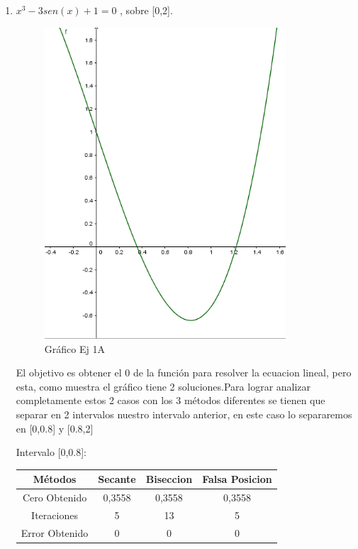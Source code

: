 \documentclass{udpreport}
\begin{document}
\begin{enumerate}
\begin{enumerate}
    \item  \(x^3 - 3sen(x) +1 = 0\) , sobre [0,2].
        \begin{figure}[H]
            \centering
            \includegraphics[width=9cm]{GraficoEj1a}
             \caption{Gráfico Ej 1A}
        \end{figure}
        El objetivo es obtener el 0 de la función para resolver la ecuacion lineal, pero esta, como muestra el gráfico tiene 2 soluciones.Para lograr analizar completamente estos 2 casos con los 3 métodos diferentes se tienen que separar en 2 intervalos nuestro intervalo anterior, en este caso lo separaremos en [0,0.8] y [0.8,2]\\
            \begin{table}[H]Intervalo [0,0.8]:
            \centering
                \begin{tabular} { |c|c|c|c|}
                \hline
                Métodos       & Secante & Biseccion & Falsa Posicion  \\
                \hline
                Cero Obtenido &  0,3558       &    0,3558       &      0,3558    \\
                \hline
                Iteraciones   &     5        &      13     &        5          \\
                \hline
                Error Obtenido &       0      &       0      &     0         \\
                 \hline
                \end{tabular}
            \end{table}
        

\end{enumerate}
\end{enumerate}
\end{document}

